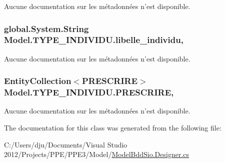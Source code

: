 Aucune documentation sur les métadonnées n'est disponible. 

\hypertarget{class_model_1_1_t_y_p_e___i_n_d_i_v_i_d_u_a4d64f0dbaf0b613a4a85e723bd79fe7b}{
\subsubsection[{libelle\-\_\-individu}]{\setlength{\rightskip}{0pt plus 5cm}global.\-System.\-String Model.\-T\-Y\-P\-E\-\_\-\-I\-N\-D\-I\-V\-I\-D\-U.\-libelle\-\_\-individu\hspace{0.3cm}{\ttfamily [get]}, {\ttfamily [set]}}}\label{class_model_1_1_t_y_p_e___i_n_d_i_v_i_d_u_a4d64f0dbaf0b613a4a85e723bd79fe7b}


Aucune documentation sur les métadonnées n'est disponible. 

\hypertarget{class_model_1_1_t_y_p_e___i_n_d_i_v_i_d_u_a46a1e5dddb1e4dcf9aebeda2dde6e6d6}{
\subsubsection[{P\-R\-E\-S\-C\-R\-I\-R\-E}]{\setlength{\rightskip}{0pt plus 5cm}Entity\-Collection$<${\bf P\-R\-E\-S\-C\-R\-I\-R\-E}$>$ Model.\-T\-Y\-P\-E\-\_\-\-I\-N\-D\-I\-V\-I\-D\-U.\-P\-R\-E\-S\-C\-R\-I\-R\-E\hspace{0.3cm}{\ttfamily [get]}, {\ttfamily [set]}}}\label{class_model_1_1_t_y_p_e___i_n_d_i_v_i_d_u_a46a1e5dddb1e4dcf9aebeda2dde6e6d6}


Aucune documentation sur les métadonnées n'est disponible. 



The documentation for this class was generated from the following file\-:\begin{DoxyCompactItemize}
\item 
C\-:/\-Users/dju/\-Documents/\-Visual Studio 2012/\-Projects/\-P\-P\-E/\-P\-P\-E3/\-Model/\hyperlink{_model_bdd_sio_8_designer_8cs}{Model\-Bdd\-Sio.\-Designer.\-cs}\end{DoxyCompactItemize}
